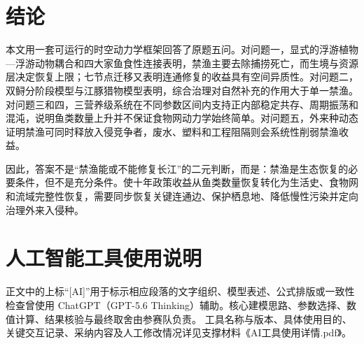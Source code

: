 \documentclass[withoutpreface,bwprint]{cumcmthesis}
\begin{document}
\section{结论}

本文用一套可运行的时空动力学框架回答了原题五问。对问题一，显式的浮游植物—浮游动物耦合和四大家鱼食性连接表明，禁渔主要去除捕捞死亡，而生境与资源层决定恢复上限；七节点迁移又表明连通修复的收益具有空间异质性。对问题二，双鲟分阶段模型与江豚猎物模型表明，综合治理对自然补充的作用大于单一禁渔。对问题三和四，三营养级系统在不同参数区间内支持正内部稳定共存、周期振荡和混沌，说明鱼类数量上升并不保证食物网动力学始终简单。对问题五，外来种动态证明禁渔可同时释放入侵竞争者，废水、塑料和工程阻隔则会系统性削弱禁渔收益。\AIassistmark

因此，答案不是“禁渔能或不能修复长江”的二元判断，而是：禁渔是生态恢复的必要条件，但不是充分条件。使十年政策收益从鱼类数量恢复转化为生活史、食物网和流域完整性恢复，需要同步恢复关键连通边、保护栖息地、降低慢性污染并定向治理外来入侵种。


\section*{人工智能工具使用说明}
正文中的上标“[AI]”用于标示相应段落的文字组织、模型表述、公式排版或一致性检查曾使用
ChatGPT（GPT-5.6 Thinking）辅助\cite{chatgpt2026}。核心建模思路、参数选择、数值计算、结果核验与最终取舍由参赛队负责。
工具名称与版本、具体使用目的、关键交互记录、采纳内容及人工修改情况详见支撑材料《AI工具使用详情.pdf》。
\end{document}

